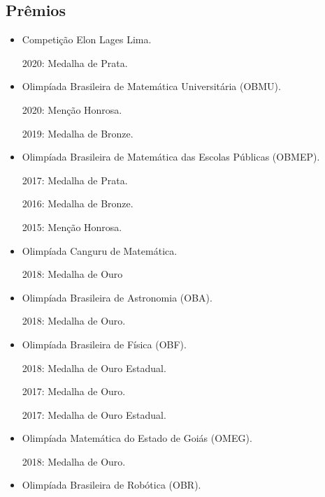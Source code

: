 \documentclass[a4paper]{article}
\begin{document}
\begin{paracol}{2}
\vspace{-2em}

\section*{\faAward \; Prêmios}
\begin{minipage}[t]{0.33\textwidth}
\begin{itemize}
\item Competição Elon Lages Lima.

2020: Medalha de Prata.

\item Olimpíada Brasileira de Matemática \newline Universitária (OBMU).

2020: Menção Honrosa.

2019: Medalha de Bronze.

\item Olimpíada Brasileira de Matemática \newline das Escolas Públicas (OBMEP).

2017: Medalha de Prata.

2016: Medalha de Bronze.

2015: Menção Honrosa.

\item Olimpíada Canguru de Matemática.

2018: Medalha de Ouro


\item Olimpíada Brasileira de Astronomia \newline (OBA).

2018: Medalha de Ouro.
\end{itemize}
\end{minipage}
\begin{minipage}[t]{0.33\textwidth}
\begin{itemize}
\item Olimpíada Brasileira de Física (OBF).

2018: Medalha de Ouro Estadual.

2017: Medalha de Ouro.

2017: Medalha de Ouro Estadual.

\item Olimpíada Matemática do Estado de Goiás (OMEG).

2018: Medalha de Ouro.

\item Olimpíada Brasileira de Robótica (OBR).


\end{itemize}
\end{minipage}
\end{paracol}
\end{document}
